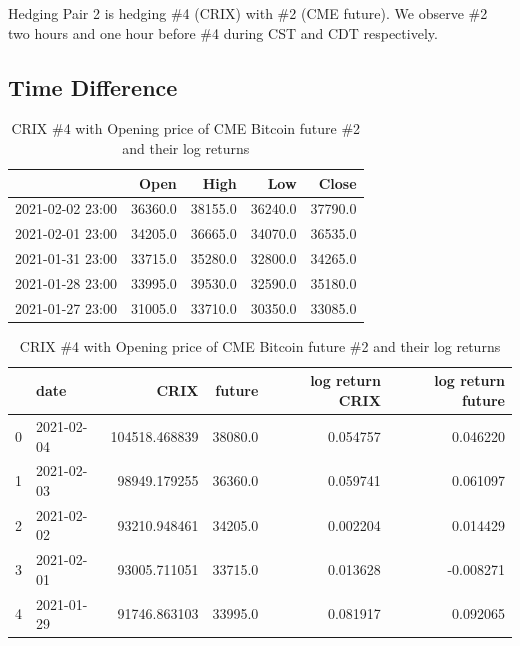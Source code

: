 Hedging Pair 2 is hedging \#4 (CRIX) with \#2 (CME future).
We observe \#2 two hours and one hour before \#4 during CST and CDT respectively.


\subsection{Time Difference}\label{subsec:time-difference}
\begin{table}[h]
    \centering

\begin{tabular}{lrrrr}
\toprule
{} &     Open &     High &      Low &    Close \\
\midrule
2021-02-02 23:00 &  36360.0 &  38155.0 &  36240.0 &  37790.0 \\
2021-02-01 23:00 &  34205.0 &  36665.0 &  34070.0 &  36535.0 \\
2021-01-31 23:00 &  33715.0 &  35280.0 &  32800.0 &  34265.0 \\
2021-01-28 23:00 &  33995.0 &  39530.0 &  32590.0 &  35180.0 \\
2021-01-27 23:00 &  31005.0 &  33710.0 &  30350.0 &  33085.0 \\
\bottomrule
\end{tabular}
       \caption{CME Bitcoin Future Raw Data}
    \label{tab:table0} \medskip

    \begin{tabular}[width=\textwidth]{llrrrr}
\toprule
 &                      date &           CRIX &   future &  log return CRIX &  log return future \\
\midrule
0 & 2021-02-04  &  104518.468839 &  38080.0 &         0.054757 &           0.046220 \\
1 & 2021-02-03  &   98949.179255 &  36360.0 &         0.059741 &           0.061097 \\
2 & 2021-02-02  &   93210.948461 &  34205.0 &         0.002204 &           0.014429 \\
3 & 2021-02-01  &   93005.711051 &  33715.0 &         0.013628 &          -0.008271 \\
4 & 2021-01-29  &   91746.863103 &  33995.0 &         0.081917 &           0.092065 \\
\bottomrule
    \end{tabular}
    \caption{CRIX \#4 with Opening price of CME Bitcoin future \#2 and their log returns}
    \label{tab:table2} \medskip


\end{table}
